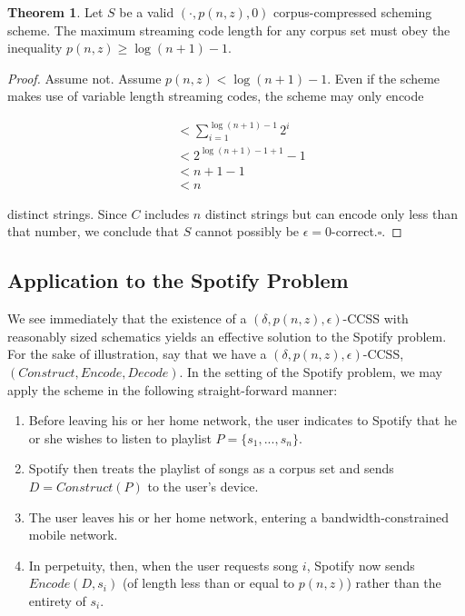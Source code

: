 \documentclass{article}
\theoremstyle{definition}
\newtheorem{theorem}{Theorem}[section]
\begin{document}
\begin{theorem}
\label{CodeLenLB}
Let $S$ be a valid $(\cdot, p(n,z), 0)$ corpus-compressed scheming scheme.  The 
maximum streaming code length for any corpus set must obey the inequality $p(n,z) \geq \log (n+1) - 1$.
\end{theorem}

\begin{proof}
Assume not.  Assume $p(n,z) < \log (n+1) - 1$.  Even if the scheme makes use of variable length 
streaming codes, the scheme may only encode

\begin{align*}
& < \sum_{i=1}^{\log (n+1)-1} 2^i \\
& < 2^{\log (n+1) - 1 + 1} - 1 \\
& < n + 1 - 1\\
& < n
\end{align*}

\noindent distinct strings.  Since $C$ includes $n$ distinct strings but can encode 
only less than that number, we conclude that $S$ cannot possibly be $\epsilon=0$-correct.$\square$.
\end{proof}

\subsection{Application to the Spotify Problem}

We see immediately that the existence of a $(\delta, p(n,z), \epsilon)$-CCSS with reasonably 
sized schematics yields an effective solution to the Spotify problem.  For the sake of illustration,
say that we have a $(\delta, p(n,z), \epsilon)$-CCSS, $(Construct, Encode, Decode)$.  
In the setting of the Spotify problem, we may apply the scheme in the following straight-forward manner:

\begin{enumerate}
\item{Before leaving his or her home network, the user indicates to Spotify that he or she wishes to 
listen to playlist $P=\{s_1,...,s_n\}$.}
\item{Spotify then treats the playlist of songs as a corpus set and sends $D = Construct(P)$ to the user's device.}
\item{The user leaves his or her home network, entering a bandwidth-constrained mobile network.}
\item{In perpetuity, then, when the user requests song $i$, Spotify now sends $Encode(D,s_i)$ (of length 
less than or equal to $p(n,z)$) rather than the entirety of $s_i$.}
\end{enumerate}
\end{document}
